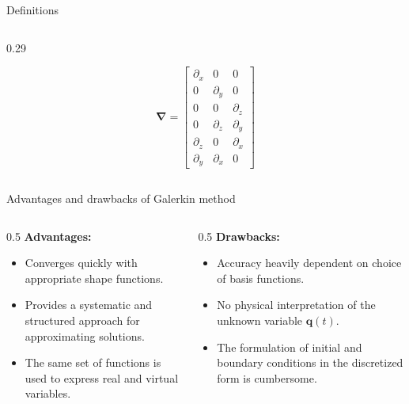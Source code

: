 \documentclass[aspectratio=169]{beamer}
\begin{document}
{{\begin{frame}{Definitions}
\begin{columns}[onlytextwidth]
        \begin{column}{0.29\textwidth}
          \begin{tcolorbox}[colback=darkred!10,colframe=darkred!40!black,]
            \vspace{-0.5cm}
            \[
              \boldsymbol{\nabla} =
              \begin{bmatrix}
                \partial_x & 0          & 0          \\
                0          & \partial_y & 0          \\
                0          & 0          & \partial_z \\
                0          & \partial_z & \partial_y \\
                \partial_z & 0          & \partial_x \\
                \partial_y & \partial_x & 0
              \end{bmatrix}
            \]
          \end{tcolorbox}
        \end{column}
      \end{columns}
    \end{frame}

    \begin{frame}{Advantages and drawbacks of Galerkin method}
      \begin{columns}
        \begin{column}{0.5\textwidth}
          \textbf{Advantages:}
          \begin{itemize}
            \item[\Checkmark]Converges quickly with appropriate shape functions.
            \item[\Checkmark]  Provides a systematic and structured approach for approximating solutions.
            \item[\Checkmark] The same set of functions is used to express real and virtual variables.
          \end{itemize}
        \end{column}

        \begin{column}{0.5\textwidth}
          \textbf{Drawbacks:}
          \begin{itemize}
            \item[\XSolidBrush] Accuracy heavily dependent on choice of basis functions.
            \item[\XSolidBrush]No physical interpretation of the unknown variable $\mathbf q(t)$.
            \item[\XSolidBrush] The formulation of initial and boundary conditions in the discretized form is cumbersome.
          \end{itemize}
        \end{column}
      \end{columns}
    \end{frame}

}}
\end{document}
